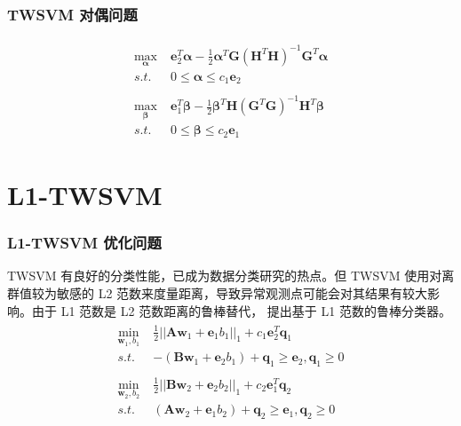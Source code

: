\documentclass{beamer}
\begin{document}
\begin{frame}
\frametitle{TWSVM 对偶问题}
\begin{align}
\begin{split}
\max\limits_{\pmb{\alpha}} \; & \mathbf{e}_2^T \pmb{\alpha}-\frac{1}{2}\pmb{\alpha}^T\mathbf{G}(\mathbf{H}^T\mathbf{H})^{-1}\mathbf{G}^T\pmb{\alpha} \\
s.t. \; & 0 \leq \pmb{\alpha}\leq c_1 \mathbf{e}_2
\end{split}
\\
\begin{split}
\max\limits_{\pmb{\beta}} \; & \mathbf{e}_1^T \pmb{\beta}-\frac{1}{2}\pmb{\beta}^T\mathbf{H}(\mathbf{G}^T\mathbf{G})^{-1}\mathbf{H}^T\pmb{\beta} \\
s.t. \; & 0 \leq \pmb{\beta} \leq c_2\mathbf{e}_1
\end{split}
\end{align}
\end{frame}

\section{L1-TWSVM}
\begin{frame}
\frametitle{L1-TWSVM 优化问题}
TWSVM 有良好的分类性能，已成为数据分类研究的热点。但 TWSVM 使用对离群值较为敏感的 L2 范数来度量距离，导致异常观测点可能会对其结果有较大影响。由于 L1 范数是 L2 范数距离的鲁棒替代，\parencite{yan2018efficient} 提出基于 L1 范数的鲁棒分类器。
\begin{align}
\begin{split}
\label{ts3}
    \min\limits_{\mathbf{w}_1,b_1} \;& \frac{1}{2}||\mathbf{Aw}_1+\mathbf{e}_1b_1||_1+c_1\mathbf{e}_2^T\mathbf{q}_1 \\
    s.t.\;& -(\mathbf{Bw}_1+\mathbf{e}_2b_1)+\mathbf{q}_1 \geq \mathbf{e}_2,\mathbf{q}_1\geq 0
\end{split}
\\
\begin{split}
\label{ts4}
    \min\limits_{\mathbf{w}_2,b_2} \;& \frac{1}{2}||\mathbf{Bw}_2+\mathbf{e}_2b_2||_1+c_2\mathbf{e}_1^T\mathbf{q}_2 \\
    s.t. \; &(\mathbf{Aw}_2+\mathbf{e}_1b_2)+\mathbf{q}_2\geq \mathbf{e}_1, \mathbf{q}_2\geq 0
\end{split} 
\end{align}
\end{frame}

\end{document}
